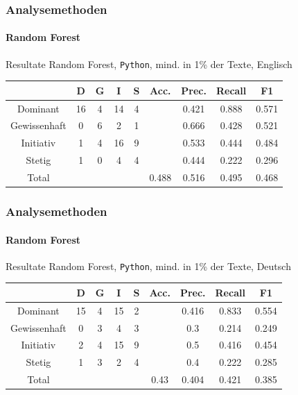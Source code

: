 \begin{frame}
\frametitle{Analysemethoden}
\framesubtitle{Random Forest}
Resultate Random Forest, \texttt{Python}, mind. in 1\% der Texte, Englisch
\begin{center}
\begin{tabular}{|c|c|c|c|c|c|c|c|c|}
\hline
 &  D 	& G	& I & S	& Acc.	& Prec. & Recall	& F1\\
\hline
Dominant & 16 & 4 & 14 & 4 &&0.421 & 0.888 & 0.571 \\
Gewissenhaft & 0 & 6 & 2 & 1&&0.666 & 0.428 & 0.521 \\
Initiativ & 1 & 4 & 16 & 9&&0.533 & 0.444 & 0.484 \\
Stetig & 1 & 0 & 4 & 4&&0.444 & 0.222 & 0.296 \\
\hline
Total 	&		&		& & 		& 0.488		&  0.516 & 0.495 & 0.468\\
\hline
\end{tabular}
\end{center}
\end{frame}
\begin{frame}
\frametitle{Analysemethoden}
\framesubtitle{Random Forest}
Resultate Random Forest, \texttt{Python}, mind. in 1\% der Texte, Deutsch
\begin{center}
\begin{tabular}{|c|c|c|c|c|c|c|c|c|}
\hline
 &  D 	& G	& I & S	& Acc.	& Prec. & Recall	& F1\\
\hline
Dominant & 15 & 4 & 15 & 2 &&0.416 & 0.833 & 0.554 \\
Gewissenhaft & 0 & 3 & 4 & 3&&0.3 & 0.214 & 0.249 \\
Initiativ & 2 & 4 & 15 & 9&&0.5 &0.416 & 0.454 \\
Stetig & 1 & 3 & 2 & 4&&0.4 & 0.222 & 0.285 \\
\hline
Total 	&		&		& & 		& 0.43		&    0.404 & 0.421 & 0.385\\
\hline
\end{tabular}
\end{center}
\end{frame}
